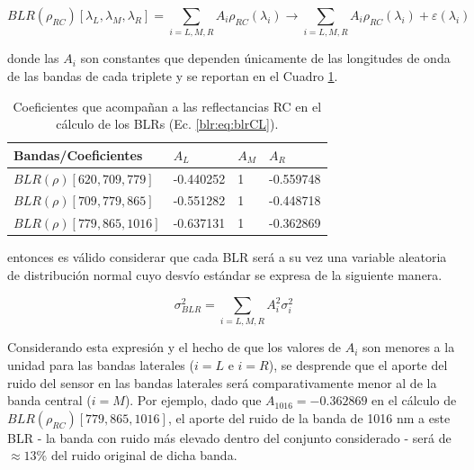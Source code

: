             \begin{equation}
                BLR(\rho_{RC})[\lambda_{L},\lambda_{M},\lambda_{R}] = \sum_{i=L,M,R} A_{i}\rho_{RC}(\lambda_{i}) \rightarrow \sum_{i=L,M,R} A_{i}\rho_{RC}(\lambda_{i}) + \varepsilon(\lambda_{i})
                \label{blr:eq:blrCL}
            \end{equation}

            \noindent
            donde las $A_{i}$ son constantes que dependen únicamente de las longitudes de onda de las bandas de cada triplete y se reportan en el Cuadro \ref{blr:tab:blrCoef}.

            \begin{table}
            \caption{Coeficientes que acompañan a las reflectancias RC en el cálculo de los BLRs (Ec. \ref{blr:eq:blrCL}).}
            \begin{tabular}{|l|l|l|l|}
            \hline
            \textbf{Bandas/Coeficientes}    & \textbf{$A_{L}$} & \textbf{$A_{M}$} & \textbf{$A_{R}$} \\ \hline
            \textbf{$BLR(\rho)[620,709,779] $} & -0.440252               & 1                       & -0.559748               \\ \hline
            \textbf{$BLR(\rho)[709,779,865] $} & -0.551282               & 1                       & -0.448718               \\ \hline
            \textbf{$BLR(\rho)[779,865,1016]$} & -0.637131               & 1                       & -0.362869               \\ \hline
            \end{tabular}
            \label{blr:tab:blrCoef}
            \end{table}

            \noindent
            entonces es válido considerar que cada BLR será a su vez una variable aleatoria de distribución normal cuyo desvío estándar se expresa de la siguiente manera.

            \begin{equation}
                \sigma_{BLR}^{2} = \sum_{i=L,M,R}A_{i}^{2}\sigma_{i}^{2}
                \label{blr:eq:blrNoiseCL}
            \end{equation}
            
            Considerando esta expresión y el hecho de que los valores de $A_{i}$ son menores a la unidad para las bandas laterales ($i=L$ e $i=R$), se desprende que el aporte del ruido del sensor en las bandas laterales será comparativamente menor al de la banda central ($i=M$). Por ejemplo, dado que $A_{1016} = -0.362869$ en el cálculo de $BLR(\rho_{RC})[779,865,1016]$, el aporte del ruido de la banda de 1016 nm a este BLR - la banda con ruido más elevado dentro del conjunto considerado - será de $\approx 13 \%$ del ruido original de dicha banda.

